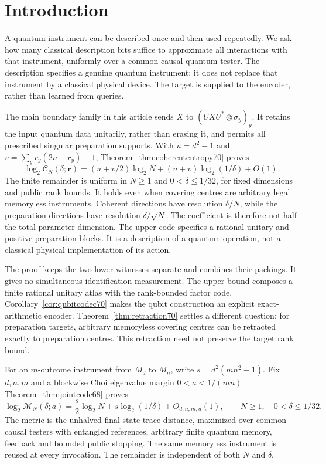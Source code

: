 \section{Introduction}
A quantum instrument can be described once and then used repeatedly.
We ask how many classical description bits suffice to approximate
all interactions with that instrument, uniformly over a common
causal quantum tester. The description specifies a genuine quantum
instrument; it does not replace that instrument by a classical
physical device. The target is supplied to the encoder, rather than
learned from queries.

The main boundary family in this article sends
$X$ to $(UXU^*\otimes\sigma_y)_y$. It retains the input quantum data
unitarily, rather than erasing it, and permits all prescribed singular
preparation supports. With $u=d^2-1$ and
$v=\sum_y r_y(2n-r_y)-1$, Theorem~\ref{thm:coherententropy70} proves
\[
 \log_2\mathcal C_N(\delta;\boldsymbol r)
 =(u+v/2)\log_2N+(u+v)\log_2(1/\delta)+O(1).
\]
The finite remainder is uniform in $N\ge1$ and $0<\delta\le1/32$, for
fixed dimensions and public rank bounds. It holds even when covering centres
are arbitrary legal memoryless instruments. Coherent directions have
resolution $\delta/N$, while the preparation directions have resolution
$\delta/\sqrt N$. The coefficient is therefore not half the total
parameter dimension. The upper code specifies a rational unitary and
positive preparation blocks. It is a description of a quantum operation,
not a classical physical implementation of its action.

The proof keeps the two lower witnesses separate and combines their
packings. It gives no simultaneous identification measurement. The upper
bound composes a finite rational unitary atlas with the rank-bounded factor
code. Corollary~\ref{cor:qubitcodec70} makes the qubit construction an
explicit exact-arithmetic encoder. Theorem~\ref{thm:retraction70} settles
a different question: for preparation targets, arbitrary memoryless
covering centres can be retracted exactly to preparation centres. This
retraction need not preserve the target rank bound.

For an $m$-outcome instrument from $M_d$ to $M_n$, write
$s=d^2(mn^2-1)$. Fix $d,n,m$ and a blockwise Choi eigenvalue margin
$0<a<1/(mn)$. Theorem~\ref{thm:jointcode68} proves
\begin{equation*}
 \log_2\mathcal M_N(\delta;a)
 =\frac{s}{2}\log_2 N+s\log_2(1/\delta)+O_{d,n,m,a}(1),
 \qquad N\ge1,\quad 0<\delta\le1/32.
\end{equation*}
The metric is the unhalved final-state trace distance, maximized over
common causal testers with entangled references, arbitrary finite
quantum memory, feedback and bounded public stopping. The same
memoryless instrument is reused at every invocation. The remainder
is independent of both $N$ and $\delta$.

